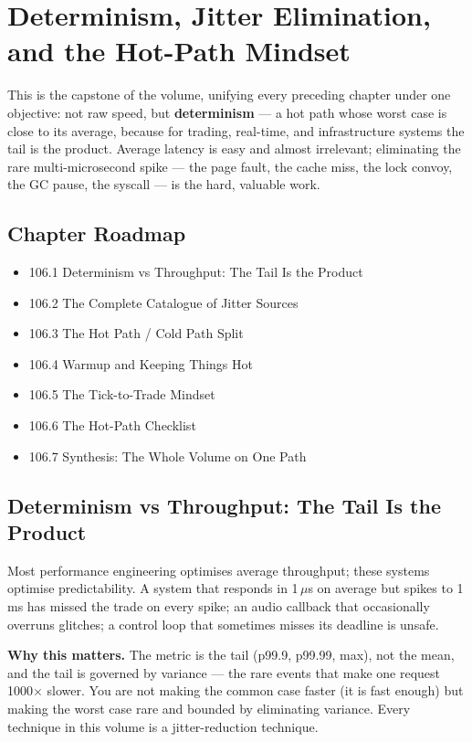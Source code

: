 \chapter{Determinism, Jitter Elimination, and the Hot-Path Mindset}

This is the capstone of the volume, unifying every preceding chapter under one objective: not raw speed, but \textbf{determinism} --- a hot path whose worst case is close to its average, because for trading, real-time, and infrastructure systems the tail is the product. Average latency is easy and almost irrelevant; eliminating the rare multi-microsecond spike --- the page fault, the cache miss, the lock convoy, the GC pause, the syscall --- is the hard, valuable work.

\section*{Chapter Roadmap}
\begin{itemize}
\item 106.1 Determinism vs Throughput: The Tail Is the Product
\item 106.2 The Complete Catalogue of Jitter Sources
\item 106.3 The Hot Path / Cold Path Split
\item 106.4 Warmup and Keeping Things Hot
\item 106.5 The Tick-to-Trade Mindset
\item 106.6 The Hot-Path Checklist
\item 106.7 Synthesis: The Whole Volume on One Path
\end{itemize}

\section{Determinism vs Throughput: The Tail Is the Product}
Most performance engineering optimises average throughput; these systems optimise predictability. A system that responds in 1\,$\mu$s on average but spikes to 1\,ms has missed the trade on every spike; an audio callback that occasionally overruns glitches; a control loop that sometimes misses its deadline is unsafe.

\textbf{Why this matters.} The metric is the tail (p99.9, p99.99, max), not the mean, and the tail is governed by variance --- the rare events that make one request 1000$\times$ slower. You are not making the common case faster (it is fast enough) but making the worst case rare and bounded by eliminating variance. Every technique in this volume is a jitter-reduction technique.

